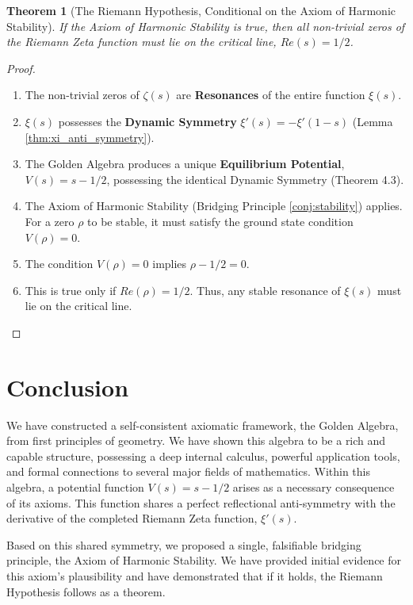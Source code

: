 \documentclass{article}
\theoremstyle{plain}
\newtheorem{theorem}{Theorem}[section]
\theoremstyle{definition}
\theoremstyle{remark}
\begin{document}
\begin{theorem}[The Riemann Hypothesis, Conditional on the Axiom of Harmonic Stability]
If the Axiom of Harmonic Stability is true, then all non-trivial zeros of the Riemann Zeta function must lie on the critical line, $Re(s)=1/2$.
\end{theorem}
\begin{proof}
\begin{enumerate}
    \item The non-trivial zeros of $\zeta(s)$ are \textbf{Resonances} of the entire function $\xi(s)$.
    \item $\xi(s)$ possesses the \textbf{Dynamic Symmetry} $\xi'(s) = -\xi'(1-s)$ (Lemma \ref{thm:xi_anti_symmetry}).
    \item The Golden Algebra produces a unique \textbf{Equilibrium Potential}, $V(s) = s - 1/2$, possessing the identical Dynamic Symmetry (Theorem 4.3).
    \item The Axiom of Harmonic Stability (Bridging Principle \ref{conj:stability}) applies. For a zero $\rho$ to be stable, it must satisfy the ground state condition $V(\rho)=0$.
    \item The condition $V(\rho)=0$ implies $\rho - 1/2 = 0$.
    \item This is true only if $Re(\rho) = 1/2$. Thus, any stable resonance of $\xi(s)$ must lie on the critical line.
\end{enumerate}
\end{proof}

\section{Conclusion}
We have constructed a self-consistent axiomatic framework, the Golden Algebra, from first principles of geometry. We have shown this algebra to be a rich and capable structure, possessing a deep internal calculus, powerful application tools, and formal connections to several major fields of mathematics. Within this algebra, a potential function $V(s) = s - 1/2$ arises as a necessary consequence of its axioms. This function shares a perfect reflectional anti-symmetry with the derivative of the completed Riemann Zeta function, $\xi'(s)$.

Based on this shared symmetry, we proposed a single, falsifiable bridging principle, the Axiom of Harmonic Stability. We have provided initial evidence for this axiom's plausibility and have demonstrated that if it holds, the Riemann Hypothesis follows as a theorem.
\end{document}
